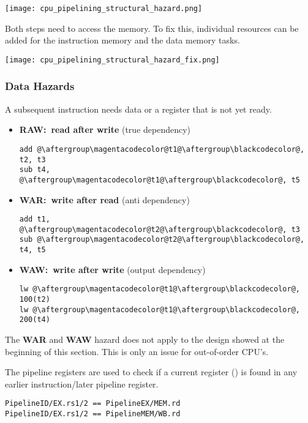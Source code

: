 \texttt{[image: cpu\_pipelining\_structural\_hazard.png]}

Both steps need to access the memory. To fix this, individual resources can be added for the instruction memory and the data memory tasks.

\begin{center}
    \texttt{[image: cpu\_pipelining\_structural\_hazard\_fix.png]}
\end{center}

\subsubsection{Data Hazards}\label{data hazards}

A subsequent instruction needs data or a register that is not yet ready.

\begin{itemize}
    \item \textbf{RAW:\ read after write} (true dependency)
          \begin{lstlisting}[escapechar=@]
add @\aftergroup\magentacodecolor@t1@\aftergroup\blackcodecolor@, t2, t3
sub t4, @\aftergroup\magentacodecolor@t1@\aftergroup\blackcodecolor@, t5
\end{lstlisting}
    \item \textbf{WAR:\ write after read} (anti dependency)
          \begin{lstlisting}[escapechar=@]
add t1, @\aftergroup\magentacodecolor@t2@\aftergroup\blackcodecolor@, t3
sub @\aftergroup\magentacodecolor@t2@\aftergroup\blackcodecolor@, t4, t5
\end{lstlisting}
    \item \textbf{WAW:\ write after write} (output dependency)
          \begin{lstlisting}[escapechar=@]
lw @\aftergroup\magentacodecolor@t1@\aftergroup\blackcodecolor@, 100(t2)
lw @\aftergroup\magentacodecolor@t1@\aftergroup\blackcodecolor@, 200(t4)
\end{lstlisting}
\end{itemize}

The \textbf{WAR} and \textbf{WAW} hazard does not apply to the design showed at the beginning of this section. This is only an issue for out-of-order CPU's.

\newpar{}

The pipeline registers are used to check if a current  register () is found in any earlier instruction/later pipeline register.
\begin{lstlisting}
PipelineID/EX.rs1/2 == PipelineEX/MEM.rd
PipelineID/EX.rs1/2 == PipelineMEM/WB.rd
\end{lstlisting}

